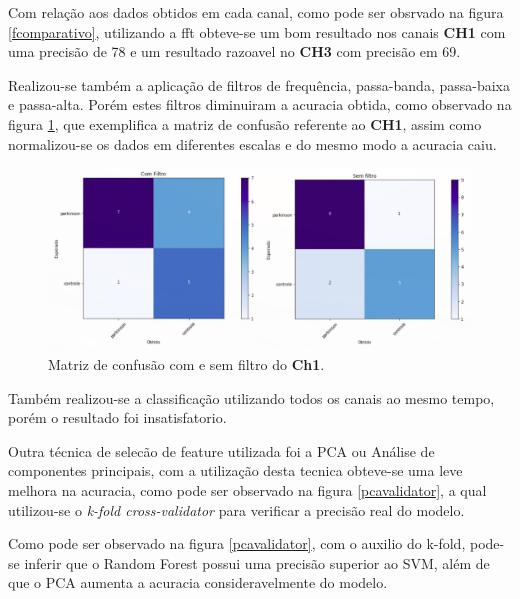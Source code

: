 Com relação aos dados obtidos em cada canal, como pode ser obsrvado na figura \ref{fcomparativo}, utilizando a fft obteve-se um bom resultado nos canais \textbf{CH1} com uma precisão de 78 e um resultado razoavel no \textbf{CH3} com precisão em 69.

Realizou-se também a aplicação de filtros de frequência, passa-banda, passa-baixa e passa-alta. Porém estes filtros diminuiram a acuracia obtida, como observado na figura \ref{comesemfiltro}, que exemplifica a matriz de confusão referente ao \textbf{CH1}, assim como normalizou-se os dados em diferentes escalas e do mesmo modo a acuracia caiu.


\begin{figure}[!htb]
	\centering
	\includegraphics[width=1.1\textwidth]{figuras/comesemfiltro.eps}
	\caption{Matriz de confusão com e sem filtro do \textbf{Ch1}.}
	\label{comesemfiltro}
\end{figure}

Também realizou-se a classificação utilizando todos os canais ao mesmo tempo, porém o resultado foi insatisfatorio.

Outra técnica de selecão de feature utilizada foi a PCA ou Análise de componentes principais, com a utilização desta tecnica obteve-se uma leve melhora na acuracia, como pode ser observado na figura \ref{pcavalidator}, a qual utilizou-se o \textit{k-fold cross-validator} para verificar a precisão real do modelo.

Como pode ser observado na figura \ref{pcavalidator}, com o auxilio do k-fold, pode-se inferir que o Random Forest possui uma precisão superior ao SVM, além de que o PCA aumenta a acuracia consideravelmente do modelo.

